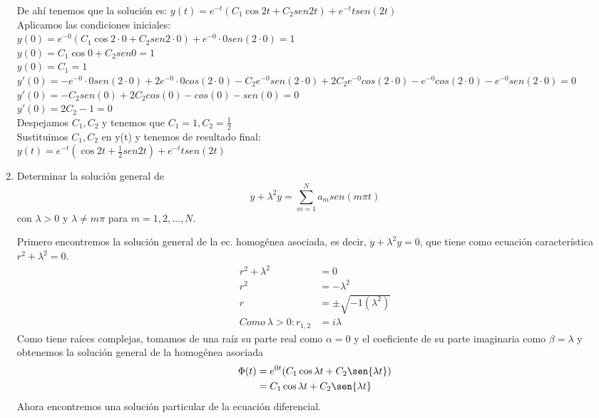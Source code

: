 \documentclass{article}
\begin{document}
\begin{enumerate}
{            De ahí tenemos que la solución es: $y(t) = e^{-t}(C_1\cos{2t}+C_2 sen{2t}) + e^{-t}tsen(2t)$\\
            
            Aplicamos las condiciones iniciales:\\
            $y(0) = e^{-0}(C_1\cos{2\cdot0}+C_2 sen{2\cdot0}) + e^{-0}\cdot0sen(2\cdot 0) = 1$\\
            $y(0) = C_1\cos{0}+C_2 sen{0} = 1$\\
            $y(0) = C_1 = 1$\\
            
            $y'(0) = -e^{-0}\cdot0sen(2\cdot 0) + 2e^{-0}\cdot0cos(2\cdot 0)  
            -C_2e^{-0}sen(2\cdot 0) + 2C_2e^{-0}cos(2\cdot 0)         -e^{-0}cos(2\cdot 0) -e^{-0}sen(2\cdot 0)= 0$\\
            $y'(0) = -C_2sen(0) + 2C_2cos(0) -cos(0) -sen(0)= 0$\\
            $y'(0) =  2C_2 -1 = 0$\\
            
            Despejamos $C_1, C_2$ y tenemos que $C_1 = 1, C_2 = \frac{1}{2}$\\
            
            Sustituimos $C_1, C_2$ en y(t) y tenemos de resultado final:\\
            $y(t) = e^{-t}(\cos{2t}+ \frac{1}{2}sen{2t}) + e^{-t}tsen(2t)$\\
        }
        \item {
            Determinar la solución general de
            $$\ddot{y}+\lambda^2y=\sum_{m=1}^{N}{a_m sen{(m\pi t)}}$$
            con $\lambda>0$ y $\lambda\neq m\pi$ para $m=1,2,\ldots,N$.

            \color{azul}
            Primero encontremos la solución general de la ec. homogénea asociada, es decir,
            $\ddot{y}+\lambda^2y=0$, que tiene como ecuación característica $r^2+\lambda^2=0$.
            \begin{align*}
            r^2+\lambda^2 &= 0 \\
            r^2 &= -\lambda^2 \\
            r &= \pm\sqrt{-1 (\lambda^2)} \\
            Como \ \lambda > 0:
            r_{1,2} &= i\lambda
            \end{align*}
            Como tiene raíces complejas, tomamos de una raíz su parte real como $\alpha=0$ y el
            coeficiente de su parte imaginaria como $\beta=\lambda$ y obtenemos la solución general de 
            la homogénea asociada
            \begin{align*}
            \Phi(t) &= e^{0t}(C_1\cos{\lambda t}+C_2\sen{\lambda t}) \\
            &= C_1\cos{\lambda t}+C_2\sen{\lambda t}
            \end{align*}
            Ahora encontremos una solución particular de la ecuación diferencial.
            
}
\end{enumerate}
\end{document}
